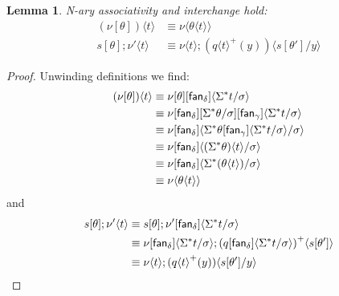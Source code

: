 \documentclass[10pt]{article}
\newtheorem{lemma}{Lemma}
\theoremstyle{definition}
\newcommand\fan[1]{\ensuremath{\mathsf{fan}_{#1}}}
\newcommand\TrPlus[2]{\ensuremath{{#1}^+(#2)}}
\newcommand\ap[2]{\ensuremath{#1 \langle #2 \rangle }}
\newcommand\ApPlus[2]{\ensuremath{{#1}^+ \langle #2 \rangle }}
\begin{document}
\begin{lemma}
N-ary associativity and interchange hold:
\begin{align*}
\ap {(\nu[\theta])} {t} &\equiv \ap \nu {\ap \theta {t}} \\
s[\theta];\ap{\nu'}{t} &\equiv \ap{\nu}{t};\ap{(\TrPlus{\ap{q}{t}}{y})}{s[\theta']/y}
\end{align*}
\end{lemma}
\begin{proof}
Unwinding definitions we find:
\begin{align*}
\ap {(\nu[\theta])} {t}
&\equiv \ap{\nu[\theta][\fan{\delta}]}{\ctxtuple t/\sigma} \\
&\equiv \ap{\nu[\fan{\delta}][\ctxtuple \theta / \sigma][\fan{\gamma}]}{\ctxtuple t/\sigma} \\
&\equiv \ap{\nu[\fan{\delta}]}{\ap{\ctxtuple \theta[\fan{\gamma}]}{\ctxtuple t/\sigma}/\sigma} \\
&\equiv \ap{\nu[\fan{\delta}]}{\ap{(\ctxtuple \theta)}{t}/\sigma} \\
&\equiv \ap{\nu[\fan{\delta}]}{\ctxtuple{(\ap \theta {t})}/\sigma} \\
&\equiv \ap \nu {\ap \theta {t}}
\end{align*}
and
\begin{align*}
s[\theta];\ap{\nu'}{t} 
&\equiv s[\theta];\ap{\nu'[\fan{\delta}]}{\ctxtuple t/\sigma} \\
&\equiv \ap{\nu[\fan{\delta}]}{\ctxtuple t/\sigma} ; \ApPlus{(\ap{q[\fan{\delta}]}{\ctxtuple t/\sigma})}{s[\theta']} \\
&\equiv \ap{\nu}{t};\ap{(\TrPlus{\ap{q}{t}}{y})}{s[\theta']/y}
\end{align*}
\end{proof}
\end{document}
